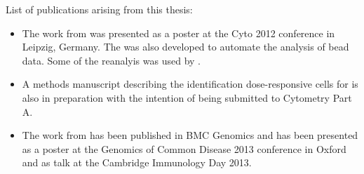 \begin{publications}


List of publications arising from this thesis:

\begin{itemize}
 \item
   The work from  was presented as a poster at the Cyto 2012 conference in Leipzig, Germany.
   The  was also developed to automate the analysis of bead data.
   Some of the reanalyis was used by \citet{Wallace:2015}.
 \item
   A methods manuscript describing the identification dose-responsive cells for  is also in preparation with the intention of being submitted to Cytometry Part A.
 \item
   The work from  has been published in BMC Genomics \citet{Pontikos:2014ho} and has been presented as a poster
   at the Genomics of Common Disease 2013 conference in Oxford and as talk at the Cambridge Immunology Day 2013.
\end{itemize}

\end{publications}

